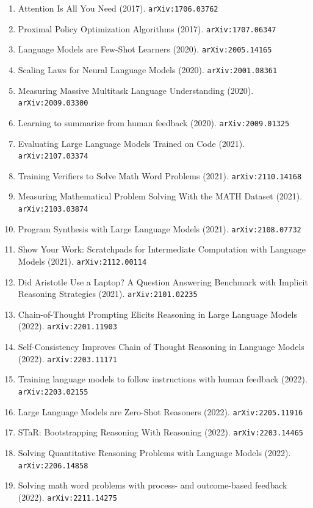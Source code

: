 \documentclass[11pt]{article}
\begin{document}
\begin{enumerate}\small
  \item Attention Is All You Need (2017). \texttt{arXiv:1706.03762}
  \item Proximal Policy Optimization Algorithms (2017). \texttt{arXiv:1707.06347}
  \item Language Models are Few-Shot Learners (2020). \texttt{arXiv:2005.14165}
  \item Scaling Laws for Neural Language Models (2020). \texttt{arXiv:2001.08361}
  \item Measuring Massive Multitask Language Understanding (2020). \texttt{arXiv:2009.03300}
  \item Learning to summarize from human feedback (2020). \texttt{arXiv:2009.01325}
  \item Evaluating Large Language Models Trained on Code (2021). \texttt{arXiv:2107.03374}
  \item Training Verifiers to Solve Math Word Problems (2021). \texttt{arXiv:2110.14168}
  \item Measuring Mathematical Problem Solving With the MATH Dataset (2021). \texttt{arXiv:2103.03874}
  \item Program Synthesis with Large Language Models (2021). \texttt{arXiv:2108.07732}
  \item Show Your Work: Scratchpads for Intermediate Computation with Language
  Models (2021). \texttt{arXiv:2112.00114}
  \item Did Aristotle Use a Laptop? A Question Answering Benchmark with Implicit
  Reasoning Strategies (2021). \texttt{arXiv:2101.02235}
  \item Chain-of-Thought Prompting Elicits Reasoning in Large Language Models (2022). \texttt{arXiv:2201.11903}
  \item Self-Consistency Improves Chain of Thought Reasoning in Language Models (2022). \texttt{arXiv:2203.11171}
  \item Training language models to follow instructions with human feedback (2022). \texttt{arXiv:2203.02155}
  \item Large Language Models are Zero-Shot Reasoners (2022). \texttt{arXiv:2205.11916}
  \item STaR: Bootstrapping Reasoning With Reasoning (2022). \texttt{arXiv:2203.14465}
  \item Solving Quantitative Reasoning Problems with Language Models (2022). \texttt{arXiv:2206.14858}
  \item Solving math word problems with process- and outcome-based feedback (2022). \texttt{arXiv:2211.14275}

\end{enumerate}
\end{document}
